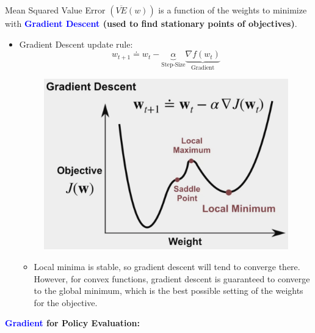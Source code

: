 \documentclass[12pt, a4paper]{article}
\begin{document}
Mean Squared Value Error $(\overline{VE}(w))$ is a function of the weights to minimize with \textbf{\textcolor{blue}{Gradient Descent} (used to find stationary points of objectives)}.
\begin{itemize}
  \item Gradient Descent update rule:
  $$
  w_{t+1} \doteq w_t - \underbrace{\alpha}_\text{Step-Size} \underbrace{\nabla f(w_t)}_\text{Gradient}
  $$
  \begin{figure}[H]
    \centering
      \includegraphics[width=0.8\columnwidth]{images/gradient-descent.png}
      \label{fig:gradient-descent}
  \end{figure}
  \begin{itemize}
    \item Local minima is stable, so gradient descent will tend to converge there. However, for convex functions, gradient descent is guaranteed to converge to the global minimum, which is the best possible setting of the weights for the objective.
  \end{itemize}
\end{itemize}






\textbf{\textcolor{blue}{Gradient} for Policy Evaluation:}
\end{document}

